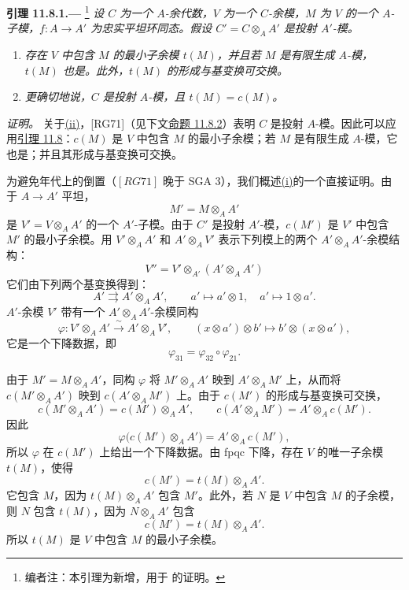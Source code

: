 \medskip
{}\label{lem:sga3-VIB-11.8.1}%
\noindent\textbf{引理 11.8.1.---}%
\footnote{\label{note:sga3-VIB-115}编者注：本引理为新增，用于  的证明。}
\emph{设 \(C\) 为一个 \(A\)-余代数，\(V\) 为一个 \(C\)-余模，\(M\) 为 \(V\) 的一个 \(A\)-子模，\(f:A\to A'\) 为忠实平坦环同态。假设 \(C'=C\otimes_AA'\) 是投射 \(A'\)-模。}
\begin{enumerate}
\item[\textup{(i)}]\label{concl:sga3-VIB-11.8.1-i}
  \emph{存在 \(V\) 中包含 \(M\) 的最小子余模 \(t(M)\)，并且若 \(M\) 是有限生成 \(A\)-模，\(t(M)\) 也是。此外，\(t(M)\) 的形成与基变换可交换。}

\item[\textup{(ii)}]\label{concl:sga3-VIB-11.8.1-ii}
  \emph{更确切地说，\(C\) 是投射 \(A\)-模，且 \(t(M)=c(M)\)。}
\end{enumerate}

\emph{证明。}
关于\hyperref[concl:sga3-VIB-11.8.1-ii]{\textup{(ii)}}，\textup{[RG71]}\textup{（见下文\hyperref[prop:sga3-VIB-11.8.2]{命题 11.8.2}）}表明 \(C\) 是投射 \(A\)-模。因此可以应用\hyperref[lem:sga3-VIB-11.8]{引理 11.8}：\(c(M)\) 是 \(V\) 中包含 \(M\) 的最小子余模；若 \(M\) 是有限生成 \(A\)-模，它也是；并且其形成与基变换可交换。

为避免年代上的倒置\textup{（\([RG71]\) 晚于 SGA 3）}，我们概述\hyperref[concl:sga3-VIB-11.8.1-i]{\textup{(i)}}的一个直接证明。由于 \(A\to A'\) 平坦，
\[
  M'=M\otimes_AA'
\]
是 \(V'=V\otimes_AA'\) 的一个 \(A'\)-子模。由于 \(C'\) 是投射 \(A'\)-模，\(c(M')\) 是 \(V'\) 中包含 \(M'\) 的最小子余模。用 \(V'\otimes_AA'\) 和 \(A'\otimes_AV'\) 表示下列模上的两个 \(A'\otimes_AA'\)-余模结构：
\[
  V''=V'\otimes_{A'}(A'\otimes_AA')
\]
它们由下列两个基变换得到：
\[
  A'\rightrightarrows A'\otimes_AA',
  \qquad
  a'\longmapsto a'\otimes1,
  \quad
  a'\longmapsto1\otimes a'.
\]
\(A'\)-余模 \(V'\) 带有一个 \(A'\otimes_AA'\)-余模同构
\label{form:sga3-VIB-11.8.1-descent-phi}%
\[
  \varphi:
  V'\otimes_AA'\xrightarrow{\ \sim\ }A'\otimes_AV',
  \qquad
  (x\otimes a')\otimes b'
    \longmapsto b'\otimes(x\otimes a'),
\]
它是一个下降数据，即
\[
  \varphi_{31}=\varphi_{32}\circ\varphi_{21}.
\]

由于 \(M'=M\otimes_AA'\)，同构 \(\varphi\) 将 \(M'\otimes_AA'\) 映到 \(A'\otimes_AM'\) 上，从而将 \(c(M'\otimes_AA')\) 映到 \(c(A'\otimes_AM')\) 上。由于 \(c(M')\) 的形成与基变换可交换，
\[
  c(M'\otimes_AA')=c(M')\otimes_AA',
  \qquad
  c(A'\otimes_AM')=A'\otimes_Ac(M').
\]
因此
\label{form:sga3-VIB-11.8.1-descent-subcomodule}%
\[
  \varphi\bigl(c(M')\otimes_AA'\bigr)
    =A'\otimes_Ac(M'),
\]
所以 \(\varphi\) 在 \(c(M')\) 上给出一个下降数据。由 fpqc 下降，存在 \(V\) 的唯一子余模 \(t(M)\)，使得
\[
  c(M')=t(M)\otimes_AA'.
\]
它包含 \(M\)，因为 \(t(M)\otimes_AA'\) 包含 \(M'\)。此外，若 \(N\) 是 \(V\) 中包含 \(M\) 的子余模，则 \(N\) 包含 \(t(M)\)，因为 \(N\otimes_AA'\) 包含
\[
  c(M')=t(M)\otimes_AA'.
\]
所以 \(t(M)\) 是 \(V\) 中包含 \(M\) 的最小子余模。

